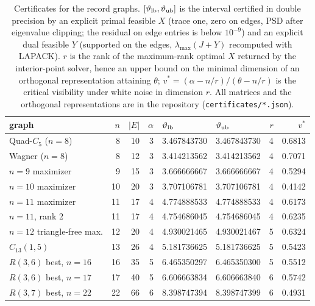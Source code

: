 \begin{table}[H]\centering\small
\caption{Certificates for the record graphs. $[\theta_{\rm lb},\theta_{\rm ub}]$ is the interval certified in double precision by an explicit primal feasible $X$ (trace one, zero on edges, PSD after eigenvalue clipping; the residual on edge entries is below $10^{-9}$) and an explicit dual feasible $Y$ (supported on the edges, $\lambda_{\max}(J+Y)$ recomputed with LAPACK). $r$ is the rank of the maximum-rank optimal $X$ returned by the interior-point solver, hence an upper bound on the minimal dimension of an orthogonal representation attaining $\theta$; $v^*=(\alpha-n/r)/(\theta-n/r)$ is the critical visibility under white noise in dimension $r$. All matrices and the orthogonal representations are in the repository (\texttt{certificates/*.json}).}
\label{tab:cert}
\begin{tabular}{lrrrllrr}\toprule
graph & $n$ & $|E|$ & $\alpha$ & $\theta_{\rm lb}$ & $\theta_{\rm ub}$ & $r$ & $v^*$ \\ \midrule
Quad-$C_5$ ($n=8$) & 8 & 10 & 3 & 3.467843730 & 3.467843730 & 4 & 0.6813 \\
Wagner ($n=8$) & 8 & 12 & 3 & 3.414213562 & 3.414213562 & 4 & 0.7071 \\
$n=9$ maximizer & 9 & 15 & 3 & 3.666666667 & 3.666666667 & 4 & 0.5294 \\
$n=10$ maximizer & 10 & 20 & 3 & 3.707106781 & 3.707106781 & 4 & 0.4142 \\
$n=11$ maximizer & 11 & 17 & 4 & 4.774888533 & 4.774888533 & 4 & 0.6173 \\
$n=11$, rank 2 & 11 & 17 & 4 & 4.754686045 & 4.754686045 & 4 & 0.6235 \\
$n=12$ triangle-free max. & 12 & 20 & 4 & 4.930021465 & 4.930021467 & 5 & 0.6324 \\
$C_{13}(1,5)$ & 13 & 26 & 4 & 5.181736625 & 5.181736625 & 5 & 0.5423 \\
$R(3,6)$ best, $n=16$ & 16 & 35 & 5 & 6.465350297 & 6.465350300 & 5 & 0.5512 \\
$R(3,6)$ best, $n=17$ & 17 & 40 & 5 & 6.606663834 & 6.606663840 & 6 & 0.5742 \\
$R(3,7)$ best, $n=22$ & 22 & 66 & 6 & 8.398747394 & 8.398747399 & 6 & 0.4931 \\
\bottomrule\end{tabular}\end{table}
